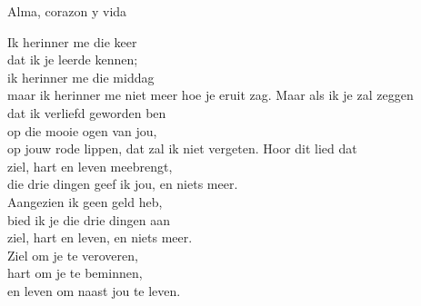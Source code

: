 \begin{song}[vals]{Alma, corazon y vida}
\clearpage
\begin{translation}
Ik herinner me die keer\\
dat ik je leerde kennen;\\
ik herinner me die middag\\
maar ik herinner me niet meer hoe je eruit zag.\vspace{2ex}
Maar als ik je zal zeggen\\
dat ik verliefd geworden ben\\
op die mooie ogen van jou,\\
op jouw rode lippen, dat zal ik niet vergeten.\vspace{2ex}
Hoor dit lied dat\\
ziel, hart en leven meebrengt,\\
die drie dingen geef ik jou, en niets meer.\\
Aangezien ik geen geld heb,\\
bied ik je die drie dingen aan\\
ziel, hart en leven, en niets meer.\\
Ziel om je te veroveren,\\
hart om je te beminnen,\\
en leven om naast jou te leven.
\end{translation}
\end{song}

